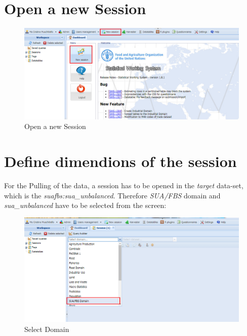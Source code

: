 \documentclass[]{article}
\begin{document}
\section{Open a new Session}\label{open-a-new-session}

\begin{figure}[H]

{\centering \includegraphics[width=1\linewidth]{images/pullData/03_NewSession2} 

}

\caption{\label{fig:f3}Open a new Session}\label{fig:f3}
\end{figure}

\section{Define dimendions of the
session}\label{define-dimendions-of-the-session}

For the Pulling of the data, a session has to be opened in the
\emph{target} data-set, which is the \emph{suafbs:sua\_unbalanced}.
Therefore \emph{SUA/FBS} domain and \emph{sua\_unbalanced} have to be
selected from the screen:

\begin{figure}[H]

{\centering \includegraphics[width=1\linewidth]{images/pullData/04_domain} 

}

\caption{\label{fig:f4}Select Domain}\label{fig:f4}
\end{figure}
\end{document}
